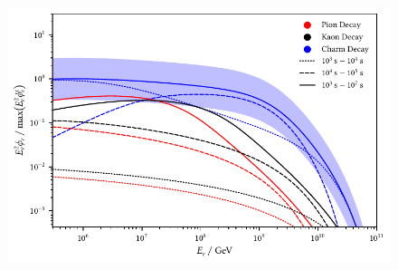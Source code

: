 \begin{figure}[H]
	\centering
	\includegraphics{../plots/build/magnetar_integrated_neutrino_spectrum_with.pdf}
	\caption[]{}
	\label{fig:magnetar-fluence-with}
\end{figure}
